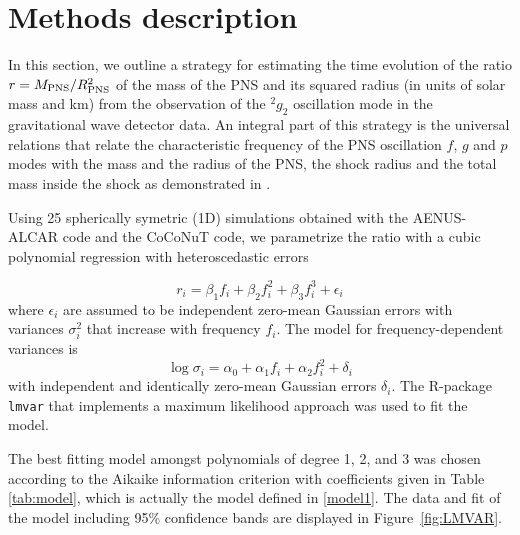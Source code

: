 \section{Methods description}
\label{methods}

In this section, we outline a strategy for estimating the time evolution of the
ratio $r=M_{\rm PNS}/R_{\rm PNS}^2$ of the mass of the PNS and its squared radius
(in units of solar mass and km) from the observation of the $\mbox{}^2g_2$
oscillation mode in the gravitational wave detector data.
An integral part of this strategy is the universal relations that relate the
characteristic frequency of the PNS oscillation $f$, $g$ and $p$ modes with the mass
and the radius of the PNS, the shock radius and the total mass inside the shock as
demonstrated in \cite{Torres:2019b}.

Using 25 spherically symetric (1D) simulations obtained with the {\sc AENUS-ALCAR }code \citep{Just_et_al__2015__mnras__Anewmultidimensionalenergy-dependenttwo-momenttransportcodeforneutrino-hydrodynamics} and the
{\sc CoCoNuT} \citep{Cerda-Duran__2008__AA__GRMHD-code} code, we parametrize the ratio with a cubic polynomial
regression with heteroscedastic errors

\begin{equation}
\label{model1}
r_i=\beta_1 f_i + \beta_2 f_i^2 +\beta_3 f_i^3 + \epsilon_i
\end{equation}
where $\epsilon_i$ are assumed to be independent zero-mean Gaussian errors with
variances $\sigma_i^2$ that increase with frequency $f_i$. The model for frequency-dependent
variances is
\begin{equation}
\log \sigma_i=\alpha_0+ \alpha_1 f_i + \alpha_2 f_i^2 + \delta_i
\end{equation}
with independent and identically zero-mean Gaussian errors $\delta_i$. The R-package \texttt{lmvar}
\cite{lmvar:2019} that implements a maximum likelihood approach was used to fit the model.

The best fitting model amongst polynomials of degree 1, 2, and 3  was chosen according to
the Aikaike information criterion with coefficients given in Table \ref{tab:model}, which is actually the model defined in \eqref{model1}.  The data and fit of the model including 95\% confidence bands are displayed in
Figure~\ref{fig:LMVAR}.


